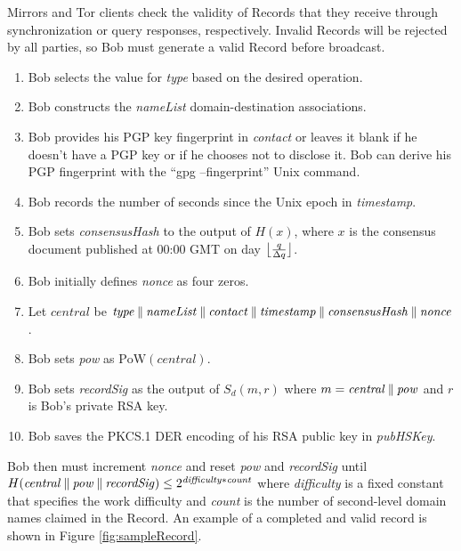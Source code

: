 Mirrors and Tor clients check the validity of Records that they receive through synchronization or query responses, respectively. Invalid Records will be rejected by all parties, so Bob must generate a valid Record before broadcast.

\begin{enumerate}
	\item Bob selects the value for \emph{type} based on the desired operation.
	\item Bob constructs the \emph{nameList} domain-destination associations.
	\item Bob provides his PGP key fingerprint in \emph{contact} or leaves it blank if he doesn't have a PGP key or if he chooses not to disclose it. Bob can derive his PGP fingerprint with the ``gpg --fingerprint'' Unix command.
	\item Bob records the number of seconds since the Unix epoch in \emph{timestamp}.
	\item Bob sets \emph{consensusHash} to the output of $ H(x) $, where $ x $ is the consensus document published at 00:00 GMT on day $ \floor[\big]{\frac{q}{\Delta q}} $.
	\item Bob initially defines \emph{nonce} as four zeros.
	\item Let $ \mathit{central} $ be $\mathit{type} \concat \mathit{nameList} \concat \mathit{contact} \concat \mathit{timestamp} \concat \mathit{consensusHash} \concat \mathit{nonce} $.
	\item Bob sets \emph{pow} as $ \mathrm{PoW}(\mathit{central}) $.
	\item Bob sets \emph{recordSig} as the output of $ S_{d}(m, r) $ where $ m = \mathit{central} \concat \mathit{pow} $ and $ r $ is Bob's private RSA key.
	\item Bob saves the PKCS.1 DER encoding of his RSA public key in \emph{pubHSKey}.
\end{enumerate}

Bob then must increment \emph{nonce} and reset \emph{pow} and \emph{recordSig} until $ H(\mathit{central} \concat \mathit{pow} \concat \mathit{recordSig}) \leq 2^{\mathit{difficulty} * \mathit{count}} $ where \emph{difficulty} is a fixed constant that specifies the work difficulty and \emph{count} is the number of second-level domain names claimed in the Record. An example of a completed and valid record is shown in Figure \ref{fig:sampleRecord}.

